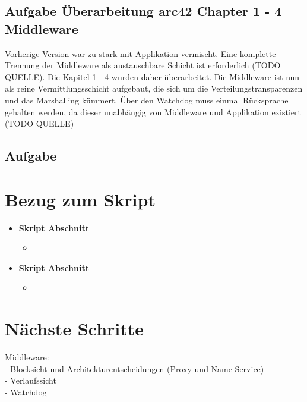 \documentclass{article}
\begin{document}
\subsection{Aufgabe Überarbeitung arc42 Chapter 1 - 4 Middleware}
Vorherige Version war zu stark mit Applikation vermischt. Eine komplette Trennung der Middleware als austauschbare Schicht ist erforderlich (TODO QUELLE). Die Kapitel 1 - 4 wurden daher überarbeitet. Die Middleware ist nun als reine Vermittlungsschicht aufgebaut, die sich um die Verteilungstransparenzen und das Marshalling kümmert. Über den Watchdog muss einmal Rücksprache gehalten werden, da dieser unabhängig von Middleware und Applikation existiert (TODO QUELLE) 

\subsection{Aufgabe}


\section{Bezug zum Skript}

\begin{itemize}
	\item \textbf{Skript Abschnitt}
		\begin{itemize}
			\item 
		\end{itemize}
	\item \textbf{Skript Abschnitt}
		\begin{itemize}
			\item 
		\end{itemize}
\end{itemize}
 
\section{Nächste Schritte}
Middleware:\\
- Blocksicht und Architekturentscheidungen (Proxy und Name Service)\\
- Verlaufssicht \\
- Watchdog \\
\end{document}
